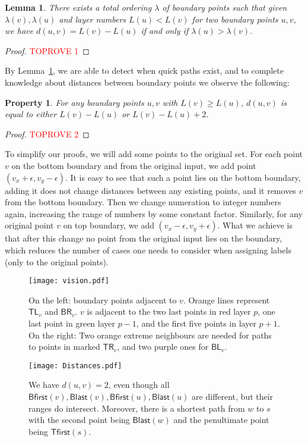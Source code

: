\documentclass[a4paper,11pt]{article}
\newcommand{\eps}{\epsilon}
\newcommand{\lam}{\lambda}
\newcommand{\BR}{\mathsf{BR}}
\newcommand{\BL}{\mathsf{BL}}
\newcommand{\TR}{\mathsf{TR}}
\newcommand{\TL}{\mathsf{TL}}
\newcommand{\Blast}{\mathsf{Blast}}
\newcommand{\Bfirst}{\mathsf{Bfirst}}
\newcommand{\Tfirst}{\mathsf{Tfirst}}
\newtheorem{lemma}[theorem]{Lemma}
\newtheorem{property}[theorem]{Property}
\begin{document}
\begin{lemma}
There exists a total ordering $\lam$ of boundary points such that given $\lam(v), \lam(u)$
and layer numbers $L(u) < L(v)$ for two boundary points $u,v$, we have $d(u,v)=L(v)-L(u)$
if and only if $\lam(u) > \lam(v)$.
\label{Lem:Lambda}
\end{lemma}
\begin{proof}\textcolor{red}{TOPROVE 1}\end{proof}


By Lemma~\ref{Lem:Lambda}, we are able to detect when quick paths exist, and to complete knowledge about distances between boundary points we observe the following:
\begin{property}
For any boundary points $u,v$ with $L(v) \geq L(u)$, $d(u,v)$ is equal to either $L(v)-L(u)$ or $L(v)-L(u)+2$.
\label{Prop:Diff2}
\end{property}
\begin{proof}\textcolor{red}{TOPROVE 2}\end{proof}

To simplify our proofs, we will add some points to the original set.
For each point $v$ on the bottom boundary and from the original input, we add point $(v_x+\eps, v_y-\eps)$.
It is easy to see that such a point lies on the bottom boundary, adding it does not change distances between any
existing points, and it removes $v$ from the bottom boundary.
Then we change numeration to integer numbers again, increasing the range of numbers by some constant factor.
Similarly, for any original point $v$ on top boundary, we add $(v_x-\eps, v_y+\eps)$.
What we achieve is that after this change no point from the original input lies on the boundary,
which reduces the number of cases one needs to consider when assigning labels (only to the original points).

\begin{figure}[h]
\begin{center}
  \texttt{[image: vision.pdf]}
\end{center}
\caption{On the left: boundary points adjacent to $v$. Orange lines represent $\TL_v$ and $\BR_v$.
$v$ is adjacent to the two last points in red layer $p$, one last point in green layer $p-1$, and the first five points in layer $p+1$.
On the right: Two orange extreme neighbours are needed for paths to points in marked $\TR_v$, and two purple ones for $\BL_v$.}
\label{Fig:Vision}
\end{figure}

\begin{figure}[h]
\begin{center}
  \texttt{[image: Distances.pdf]}
\end{center}
\caption{We have $d(u,v)=2$, even though all $\Bfirst(v),\Blast(v),\Bfirst(u),\Blast(u)$ are different, but their ranges do intersect.
Moreover, there is a shortest path from $w$ to $s$ with the second point being $\Blast(w)$ and the penultimate point being $\Tfirst(s)$.}
\label{Fig:Dist}
\end{figure}
\end{document}
